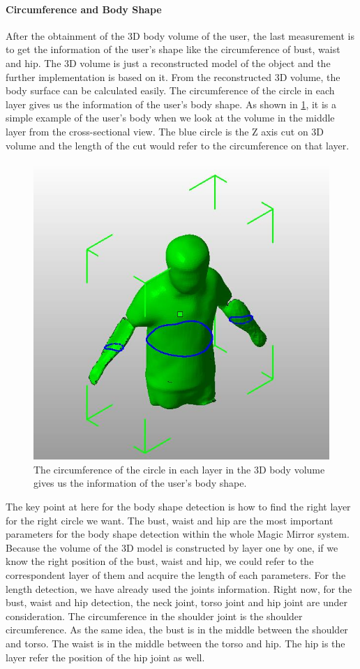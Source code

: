 \paragraph{Circumference and Body Shape}
After the obtainment of the 3D body volume of the user, the last measurement is to get the information of the user's shape like the circumference of bust, waist and hip. The 3D volume is just a reconstructed model of the object and the further implementation is based on it.
From the reconstructed 3D volume, the body surface can be calculated easily. The circumference of the circle in each layer gives us the information of the user's body shape. As shown in \figurename{\ref{fig:3-PRMM:Circumference}}, it is a simple example of the user's body when we look at the volume in the middle layer from the cross-sectional view. The blue circle is the Z axis cut on 3D volume and the length of the cut would refer to the circumference on that layer.
\begin{figure}
	\centering
	\includegraphics[width=0.5\linewidth]{figures/3-PRMM/Circumference}
	\caption{The circumference of the circle in each layer in the 3D body volume gives us the information of the user's body shape.}
	\label{fig:3-PRMM:Circumference}
\end{figure}
The key point at here for the body shape detection is how to find the right layer for the right circle we want. The bust, waist and hip are the most important parameters for the body shape detection within the whole Magic Mirror system. Because the volume of the 3D model is constructed by layer one by one, if we know the right position of the bust, waist and hip, we could refer to the correspondent layer of them and acquire the length of each parameters.
For the length detection, we have already used the joints information. Right now, for the bust, waist and hip detection, the neck joint, torso joint and hip joint are under consideration.
The circumference in the shoulder joint is the shoulder circumference. As the same idea, the bust is in the middle between the shoulder and torso. The waist is in the middle between the torso and hip. The hip is the layer refer the position of the hip joint as well.

